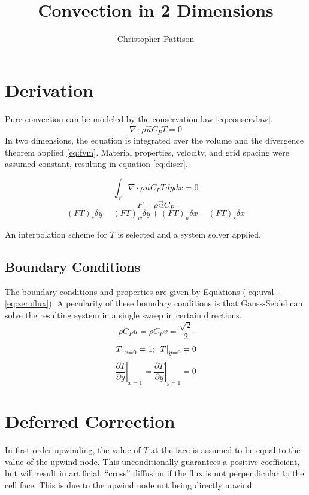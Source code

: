 \documentclass[12pt,twocolumn]{article}
\title{\vspace{-2.5em}Convection in 2 Dimensions}
\author{Christopher Pattison}
\date{}
\begin{document}
\maketitle
\section*{Derivation}
Pure convection can be modeled by the conservation law \eqref{eq:conservlaw}.
\begin{equation}\label{eq:conservlaw}\nabla\cdot\rho\vec{u}C_PT = 0\end{equation}
In two dimensions, the equation is integrated over the volume and the divergence theorem applied \eqref{eq:fvm}.
Material properties, velocity, and grid spacing were assumed constant, resulting in equation \eqref{eq:discr}.

\begin{equation}\label{eq:fvm}\int_V \nabla\cdot\rho\vec{u}C_PT dydx = 0\end{equation}
\begin{equation}F=\rho\vec{u}C_P\end{equation}
\begin{equation}\label{eq:discr}(FT)_e\delta y - (FT)_w\delta y +
(FT)_n\delta x - (FT)_s\delta x\end{equation}

An interpolation scheme for $T$ is selected and a system solver applied.

\subsection*{Boundary Conditions}
The boundary conditions and properties are given by Equations (\ref{eq:uval}-\ref{eq:zeroflux}).
A pecularity of these boundary conditions is that Gauss-Seidel can solve the resulting system in a single sweep in certain directions.
\begin{equation}\label{eq:uval}\rho C_P u= \rho C_P v=\frac{\sqrt{2}}{2}\end{equation}
\begin{equation}\left.T\right|_{x=0} = 1;\hspace{1ex}\left.T\right|_{y=0} = 0\end{equation}
\begin{equation}\label{eq:zeroflux}\left.\frac{\partial T}{\partial y}\right|_{x=1} = \left.\frac{\partial T}{\partial y}\right|_{y=1} = 0\end{equation}
\section*{Deferred Correction}
In first-order upwinding, the value of $T$ at the face is assumed to be equal 
to the value of the upwind node. This unconditionally guarantees a positive coefficient,
but will result in artificial, ``cross'' diffusion if the flux is not perpendicular to the cell face.
This is due to the upwind node not being directly upwind.
\end{document}
